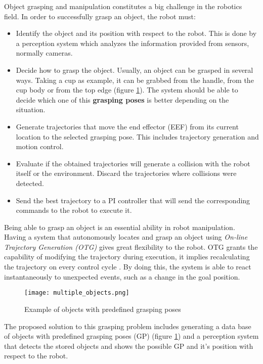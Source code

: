 Object grasping and manipulation  constitutes a big challenge in the robotics field. In order to successfully grasp an object, the robot must:
\begin{itemize}
	\item Identify the object and its position with respect to the robot. This is done by a perception system which analyzes the information provided from sensors, normally cameras.
	\item Decide how to grasp the object. Usually, an object can be grasped in several ways. Taking a cup as example, it can be grabbed from the handle, from the cup body or from the top edge (figure \ref{fig:obj_grasp_pose}). The system should be able to decide which one of this \textbf{grasping poses} is better depending on the situation.
	\item Generate trajectories that move the end effector (EEF) from its current location to the selected grasping pose. This includes trajectory generation and motion control.
	\item Evaluate if the obtained trajectories will generate a collision with the robot itself or the environment. Discard the trajectories where collisions were detected.
	\item Send the best trajectory to a PI controller that will send the corresponding commands to the robot to execute it.
\end{itemize}

Being able to grasp an object is an essential ability in robot manipulation. Having a system that autonomously locates and grasp an object using \textit{On-line Trajectory Generation (OTG)} gives great flexibility to the robot. OTG grants the capability of modifying the trajectory during execution, it implies recalculating the trajectory on every control cycle . By doing this, the system is able to react instantaneously to unexpected events, such as a change in the goal position.

\begin{figure}[H]
	\centering
	\texttt{[image: multiple\_objects.png]}
	\vspace{-10pt}
	\caption{Example of objects with predefined grasping poses}
	\vspace{-15pt}
	\label{fig:obj_grasp_pose}
\end{figure}

The proposed solution to this grasping problem includes generating a data base of objects with predefined grasping poses (GP) (figure \ref{fig:obj_grasp_pose}) and a perception system that detects the stored objects and shows the possible GP and it's position with respect to the robot.

